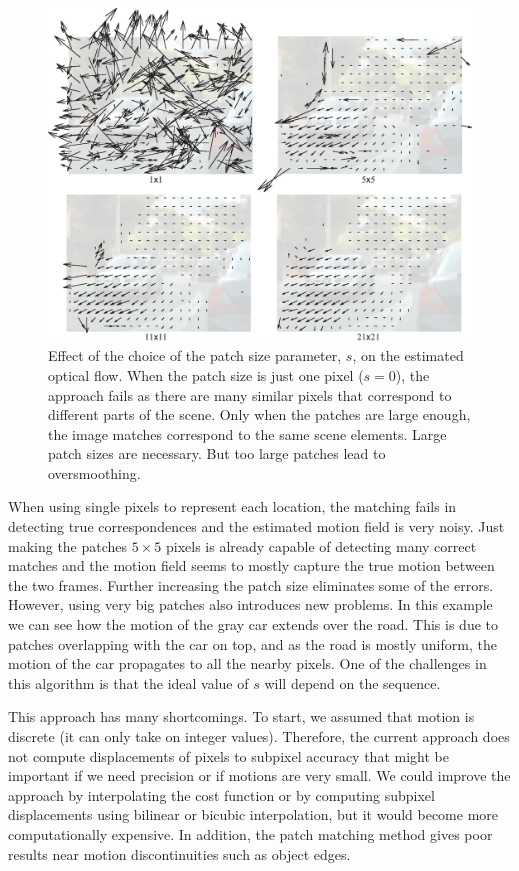 \begin{figure}[h!]
    \centerline{
        \includegraphics[width=.8\linewidth]{figures/optical_flow/matching_optical_flow_patch_size_effect.eps}
    }
    \caption{Effect of the choice of the patch size parameter, $s$, on the estimated optical flow. When the patch size is just one pixel ($s=0$), the approach fails as there are many similar pixels that correspond to different parts of the scene. Only when the patches are large enough, the image matches correspond to the same scene elements. Large patch sizes are necessary. But too large patches lead to oversmoothing. }
    \label{fig:matching_optical_flow_patch_size_effect}
\end{figure}

When using single pixels to represent each location, the matching fails in detecting true correspondences and the estimated motion field is very noisy. Just making the patches $5 \times 5$ pixels is already capable of detecting many correct matches and the motion field seems to mostly capture the true motion between the two frames. Further increasing the patch size eliminates some of the errors. However, using very big patches also introduces new problems. In this example we can see how the motion of the gray car extends over the road. This is due to patches overlapping with the car on top, and as the road is mostly uniform, the motion of the car propagates to all the nearby pixels. One of the challenges in this algorithm is that the ideal value of $s$ will depend on the sequence.


This approach has many shortcomings. To start, we assumed that motion is discrete (it can only take on integer values). Therefore, the current approach does not compute displacements of pixels to subpixel accuracy that might be important if we need precision or if motions are very small. We could improve the approach by interpolating the cost function or by computing subpixel displacements using bilinear or bicubic interpolation, but it would become more computationally expensive. In addition, the patch matching method gives poor results near motion discontinuities such as object edges.

